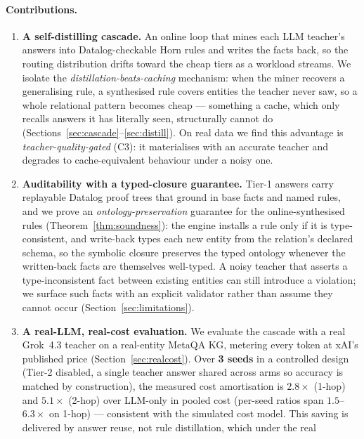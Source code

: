 \documentclass[11pt]{article}
\theoremstyle{plain}
\begin{document}
\paragraph{Contributions.}
\begin{enumerate}
  \item[(C1)] \textbf{A self-distilling cascade.} An online loop that mines
  each LLM teacher's answers into Datalog-checkable Horn rules and writes the
  facts back, so the routing distribution drifts toward the cheap tiers as a
  workload streams. We isolate the \emph{distillation-beats-caching}
  mechanism: when the miner recovers a generalising rule, a synthesised rule
  covers entities the teacher never saw, so a whole relational pattern becomes
  cheap --- something a cache, which only recalls answers it has literally
  seen, structurally cannot do
  (Sections~\ref{sec:cascade}--\ref{sec:distill}). On real data we find this
  advantage is \emph{teacher-quality-gated} (C3): it materialises with an
  accurate teacher and degrades to cache-equivalent behaviour under a noisy
  one.
  \item[(C2)] \textbf{Auditability with a typed-closure guarantee.} Tier-1
  answers carry replayable Datalog proof trees that ground in base facts and
  named rules, and we prove an \emph{ontology-preservation} guarantee for the
  online-synthesised rules (Theorem~\ref{thm:soundness}): the engine installs
  a rule only if it is type-consistent, and write-back types each new entity
  from the relation's declared schema, so the symbolic closure preserves the
  typed ontology whenever the written-back facts are themselves well-typed. A
  noisy teacher that asserts a type-inconsistent fact between existing entities
  can still introduce a violation; we surface such facts with an explicit
  validator rather than assume they cannot occur (Section~\ref{sec:limitations}).
  \item[(C3)] \textbf{A real-LLM, real-cost evaluation.} We evaluate the
  cascade with a real Grok~4.3 teacher on a real-entity MetaQA KG, metering
  every token at xAI's published price (Section~\ref{sec:realcost}).
  Over \textbf{3 seeds} in a controlled design (Tier-2 disabled, a single
  teacher answer shared across arms so accuracy is matched by construction),
  the measured cost amortisation is $2.8\times$
  (1-hop) and $5.1\times$ (2-hop) over LLM-only in pooled cost (per-seed ratios
  span $1.5$--$6.3\times$ on 1-hop) --- consistent
  with the simulated cost model. This saving is
  delivered by answer reuse, not rule distillation, which under the real

\end{enumerate}
\end{document}

